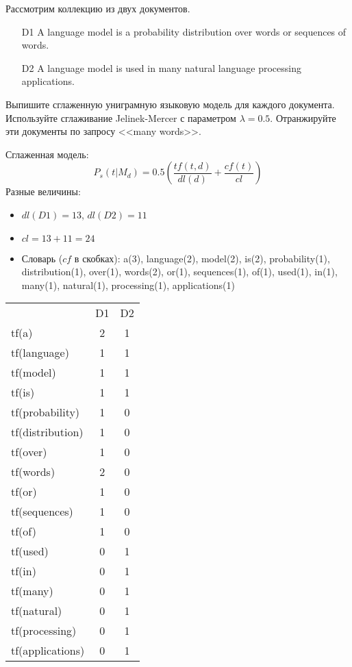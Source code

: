 \begin{task}[8]
Рассмотрим коллекцию из двух документов.
\begin{itemize}
\item[D1] A language model is a probability distribution over words or sequences of words.
\item[D2] A language model is used in many natural language processing applications.
\end{itemize}
Выпишите сглаженную униграмную языковую модель для каждого документа. Используйте
сглаживание Jelinek-Mercer с параметром $\lambda = 0.5$. Отранжируйте эти документы
по запросу <<many words>>.
\end{task}
\begin{solution}
Сглаженная модель:
\[
P_s(t|M_d) = 0.5 (\frac{tf(t, d)}{dl(d)} + \frac{cf(t)}{cl})
\]
Разные величины:
\begin{itemize}
	\item $dl(D1) = 13$, $dl(D2) = 11$
	\item $cl = 13 + 11 = 24$
	\item Словарь ($cf$ в скобках): a(3), language(2), model(2), is(2), probability(1), distribution(1), over(1), words(2), or(1), sequences(1), of(1), used(1), in(1), many(1), natural(1), processing(1), applications(1)
\end{itemize}
\begin{center}
	\begin{tabular}{lcc}
			& D1 & D2 \\
		tf(a) & 2 & 1 \\
		tf(language) & 1 & 1 \\
		tf(model) & 1 & 1 \\
		tf(is) & 1 & 1 \\
		tf(probability) & 1 & 0 \\
		tf(distribution) & 1 & 0 \\
		tf(over) & 1 & 0 \\
		tf(words) & 2 & 0 \\
		tf(or) & 1 & 0 \\
		tf(sequences) & 1 & 0 \\
		tf(of) & 1 & 0 \\
		tf(used) & 0 & 1 \\
		tf(in) & 0 & 1 \\
		tf(many) & 0 & 1 \\
		tf(natural) & 0 & 1 \\
		tf(processing) & 0 & 1 \\
		tf(applications) & 0 & 1
	\end{tabular}

\end{center}
\end{solution}
